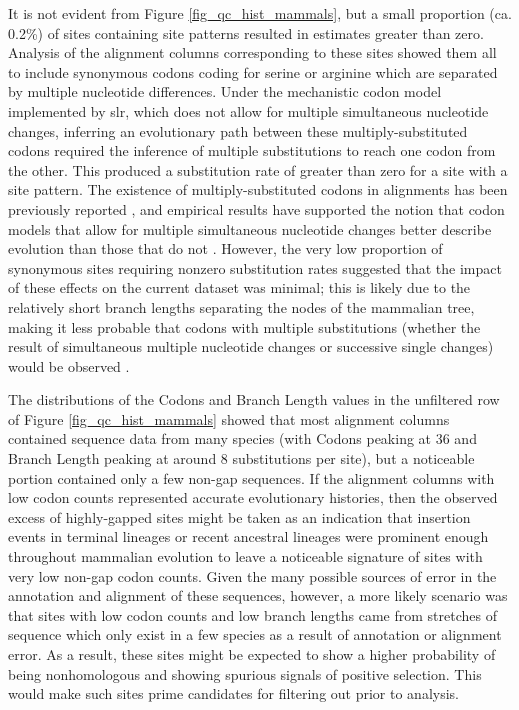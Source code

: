 It is not evident from Figure \ref{fig_qc_hist_mammals}, but a small
proportion (ca. 0.2\%) of sites containing \syn site patterns resulted
in \ml estimates greater than zero. Analysis of the alignment columns
corresponding to these sites showed them all to include synonymous
codons coding for serine or arginine which are separated by multiple
nucleotide differences. Under the mechanistic codon model implemented
by \ac{slr}, which does not allow for multiple simultaneous nucleotide
changes, inferring an evolutionary path between these
multiply-substituted codons required the inference of multiple \nsyn
substitutions to reach one codon from the other. This produced a \nsyn
substitution rate of greater than zero for a site with a \syn site
pattern. The existence of multiply-substituted codons in alignments
has been previously reported \citep{Averof2000,Whelan2004}, and
empirical results have supported the notion that codon models that
allow for multiple simultaneous nucleotide changes better describe
evolution than those that do not \citep{Kosiol2007}. However, the very
low proportion of synonymous sites requiring nonzero \nsyn
substitution rates suggested that the impact of these effects on the
current dataset was minimal; this is likely due to the relatively
short branch lengths separating the nodes of the mammalian tree,
making it less probable that codons with multiple substitutions
(whether the result of simultaneous multiple nucleotide changes or
successive single changes) would be observed \citep{Kosiol2007}.

The distributions of the \Ngap Codons and \Ngap Branch Length values
in the unfiltered row of Figure \ref{fig_qc_hist_mammals} showed that
most alignment columns contained sequence data from many species (with
\Ngap Codons peaking at 36 and \Ngap Branch Length peaking at around 8
substitutions per site), but a noticeable portion contained only a few
non-gap sequences. If the alignment columns with low \ngap codon
counts represented accurate evolutionary histories, then the observed
excess of highly-gapped sites might be taken as an indication that
insertion events in terminal lineages or recent ancestral lineages
were prominent enough throughout mammalian evolution to leave a
noticeable signature of sites with very low non-gap codon
counts. Given the many possible sources of error in the annotation and
alignment of these sequences, however, a more likely scenario was that
sites with low codon counts and low branch lengths came from stretches
of sequence which only exist in a few species as a result of
annotation or alignment error. As a result, these sites might be
expected to show a higher probability of being nonhomologous and
showing spurious signals of positive selection. This would make such
sites prime candidates for filtering out prior to analysis.

